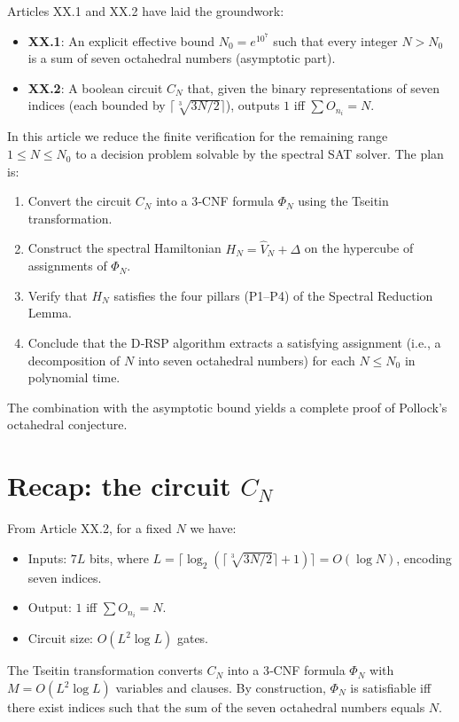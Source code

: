 \documentclass[11pt,a4paper]{article}
\begin{document}
Articles XX.1 and XX.2 have laid the groundwork:
\begin{itemize}
\item \textbf{XX.1}: An explicit effective bound \(N_0 = e^{10^7}\) such that every integer \(N > N_0\) is a sum of seven octahedral numbers (asymptotic part).
\item \textbf{XX.2}: A boolean circuit \(C_N\) that, given the binary representations of seven indices (each bounded by \(\lceil \sqrt[3]{3N/2}\rceil\)), outputs \(1\) iff \(\sum O_{n_i}=N\).
\end{itemize}
In this article we reduce the finite verification for the remaining range \(1\le N\le N_0\) to a decision problem solvable by the spectral SAT solver. The plan is:
\begin{enumerate}
\item Convert the circuit \(C_N\) into a 3‑CNF formula \(\Phi_N\) using the Tseitin transformation.
\item Construct the spectral Hamiltonian \(H_N = \hat{V}_N + \Delta\) on the hypercube of assignments of \(\Phi_N\).
\item Verify that \(H_N\) satisfies the four pillars (P1–P4) of the Spectral Reduction Lemma.
\item Conclude that the D‑RSP algorithm extracts a satisfying assignment (i.e., a decomposition of \(N\) into seven octahedral numbers) for each \(N\le N_0\) in polynomial time.
\end{enumerate}
The combination with the asymptotic bound yields a complete proof of Pollock's octahedral conjecture.

\section{Recap: the circuit \(C_N\)}

From Article XX.2, for a fixed \(N\) we have:
\begin{itemize}
\item Inputs: \(7L\) bits, where \(L = \lceil \log_2(\lceil \sqrt[3]{3N/2}\rceil+1)\rceil = O(\log N)\), encoding seven indices.
\item Output: \(1\) iff \(\sum O_{n_i}=N\).
\item Circuit size: \(O(L^2 \log L)\) gates.
\end{itemize}

The Tseitin transformation converts \(C_N\) into a 3‑CNF formula \(\Phi_N\) with \(M = O(L^2 \log L)\) variables and clauses. By construction, \(\Phi_N\) is satisfiable iff there exist indices such that the sum of the seven octahedral numbers equals \(N\).
\end{document}

